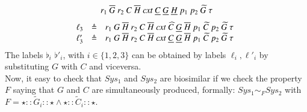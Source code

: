 {\[\begin{array}{lcl@{\hspace{0.3cm}} lcl}
r_1~\overline{G}~r_2~C~\overline{H}~\mathit{cxt}~\underline{C}~\underline{G}~\underline{H}~p_1~p_2~\widetilde{G}~\silent
\end{array}
\]
\[
\begin{array}{lcl @{\hspace{0.3cm}}lcl}
\ell_3 & \defeq & 
r_1~G~\overline{H}~r_2~C~\overline{H}~\mathit{cxt}~\widehat{C}~\underline{G}~\overline{H}~p_1~\widetilde{C}~p_2~\widetilde{G}~\silent
\\
\ell'_3 & \defeq & r_1~G~\overline{H}~r_2~C~\overline{H}~\mathit{cxt}~\underline{C}~\underline{G}~\overline{H}~p_1~\widetilde{C}~p_2~\widetilde{G}~\silent
\end{array}
\]
}
The labels $\flat_i$ $\flat'_i$, with $i \in \{1,2,3\}$ can be obtained by labels $\ell_i,\ell'_i$ by substituting $G$ with $C$ and viceversa.
\\
Now, it easy to check that $Sys_1$ and $Sys_2$ are biosimilar if we check the property $F$ saying that $G$ and $C$ are simultaneously  produced,
formally:
$Sys_1 \sim_F Sys_2$ with $F= \star :: \widetilde{G}_i :: \star \wedge  \star :: \widetilde{C}_i :: \star $.
